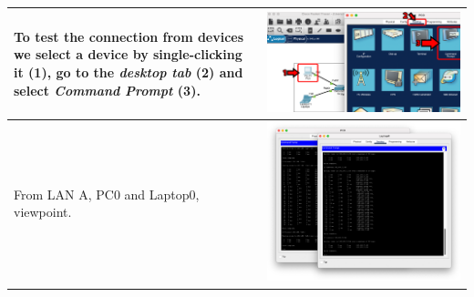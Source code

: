 \documentclass[11pt,a4paper]{report}
\begin{document}
\begin{flushleft}
\begin{center}
\begin{longtable}{ m{5cm} l }
                        To test the connection from devices we select a device by \textbf{single-clicking} it (1), go to the \textit{desktop tab} (2) and select \textit{Command Prompt} (3).                                               & \includegraphics[scale=0.31 ,valign=c]{CiscoPacketTracer_cmdOutput}   \\ \hline
                        From LAN A, PC0 and Laptop0, viewpoint.                                                                                                                                                                             & \includegraphics[scale=0.27 ,valign=c]{lana-outputall}                \\ \hline

\end{longtable}
\end{center}
\end{flushleft}
\end{document}
